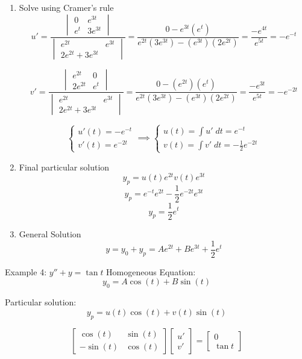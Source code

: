 \documentclass[12pt]{article}
\begin{document}
\begin{enumerate}
    \item Solve using Cramer's rule 
    \[u' = \frac{\begin{vmatrix}
        0 & e^{3t}\\
        e^{t} & 3e^{3t}
    \end{vmatrix}}{\begin{vmatrix}
    e^{2t} & e^{3t}\\
    2e^{2t} + 3e^{3t}
    \end{vmatrix}} = \frac{0 - e^{3t} (e^t)}{e^{2t} (3e^{3t}) - (e^{3t})(2e^{2t})} = \frac{-e^{4t}}{e^{5t}} = -e^{-t}\]

    \[v' = \frac{\begin{vmatrix}
        e^{2t} & 0\\
        2e^{2t} & e^t
    \end{vmatrix}}{\begin{vmatrix}
    e^{2t} & e^{3t}\\
    2e^{2t} + 3e^{3t}
    \end{vmatrix}} = \frac{0 - (e^{2t})(e^t)}{e^{2t} (3e^{3t}) - (e^{3t})(2e^{2t})} = \frac{-e^{3t}}{e^{5t}} = -e^{-2t}\]

    \[\begin{cases}
        u'(t) = -e^{-t}\\
        v'(t) = e^{-2t}
    \end{cases} \implies \begin{cases}
        u(t) = \int u' \; dt = e^{-t}\\
        v(t) = \int v' \; dt = -\frac{1}{2}e^{-2t}
    \end{cases}\]

    \item Final particular solution 
    \[y_p = u(t) e^{2t} v(t) e^{3t}\] 
    \[y_p = e^{-t} e^{2t} -\frac{1}{2}e^{-2t} e^{3t} \]
    \[y_p = \frac{1}{2}e^t\]

    \item General Solution 
    \[y = y_0 + y_p = \boxed{Ae^{2t} + Be^{3t} + \frac{1}{2}e^t}\]
\end{enumerate}

Example 4: $y'' + y = \tan t$
Homogeneous Equation: 
\[y_0 = A \cos(t) + B\sin(t)\]

Particular solution:
\[y_p = u(t) \cos(t) + v(t) \sin(t)\]

\[\begin{bmatrix}
    \cos(t) & \sin(t)\\
    -\sin(t) & \cos(t)
\end{bmatrix} \begin{bmatrix}
    u'\\
    v'
\end{bmatrix} = \begin{bmatrix}
    0\\
    \tan t
\end{bmatrix}\]
\end{document}
